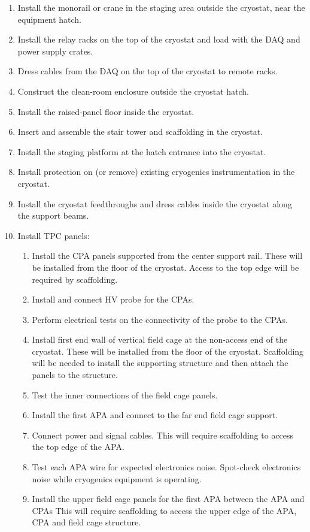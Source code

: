 \begin{enumerate}
\item Install the monorail or crane in the staging area outside the cryostat, near the equipment hatch.
\item Install the relay racks on the top of the cryostat and load with the DAQ and power supply crates.
\item Dress cables from the DAQ on the top of the cryostat to remote racks.
\item Construct the clean-room enclosure outside the cryostat hatch.
\item Install the raised-panel floor inside the cryostat. 
\item Insert and assemble the stair tower and scaffolding in the cryostat.
\item Install the staging platform at the hatch entrance into the cryostat.
\item Install protection on (or remove) existing cryogenics instrumentation in the cryostat.
\item Install the cryostat feedthroughs and dress cables inside the cryostat along the support beams.
\item Install TPC panels:
   \begin{enumerate}
   \item Install the CPA panels supported from the center support rail.  These will be installed from the floor of the cryostat.  Access to the top edge will be required by scaffolding.  
   \item Install and connect HV probe for the CPAs.
   \item Perform electrical tests on the connectivity of the probe to the CPAs.
   \item Install first end wall of vertical field cage at the non-access end of the cryostat.  These will be installed from the floor of the cryostat.  Scaffolding will be needed to install the supporting structure and then attach the panels to the structure.  
   \item Test the inner connections of the field cage panels.
   \item Install the first APA and connect to the far end field cage support.
   \item Connect power and signal cables.  This will require scaffolding to access the top edge of the APA.
   \item Test each APA wire for expected electronics noise. Spot-check electronics noise while cryogenics equipment is operating.
   \item Install the upper field cage panels for the first APA between the APA and CPAs  This will require scaffolding to access the upper edge of the APA, CPA and field cage structure.

\end{enumerate}
\end{enumerate}
